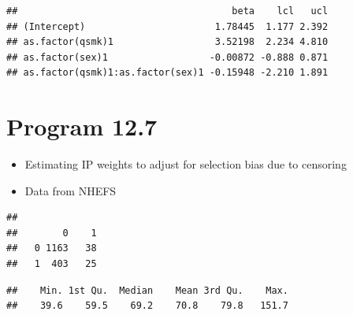 \documentclass[
  10pt,
]{book}
\newenvironment{Shaded}{\begin{snugshade}}{\end{snugshade}}
\newcommand{\DecValTok}[1]{\textcolor[rgb]{0.00,0.00,0.81}{#1}}
\newcommand{\FunctionTok}[1]{\textcolor[rgb]{0.00,0.00,0.00}{#1}}
\newcommand{\NormalTok}[1]{#1}
\newcommand{\SpecialCharTok}[1]{\textcolor[rgb]{0.00,0.00,0.00}{#1}}
\providecommand{\tightlist}{%
  \setlength{\itemsep}{0pt}\setlength{\parskip}{0pt}}
\begin{document}
\begin{verbatim}
##                                      beta    lcl   ucl
## (Intercept)                       1.78445  1.177 2.392
## as.factor(qsmk)1                  3.52198  2.234 4.810
## as.factor(sex)1                  -0.00872 -0.888 0.871
## as.factor(qsmk)1:as.factor(sex)1 -0.15948 -2.210 1.891
\end{verbatim}

\hypertarget{program-12.7}{%
\section{Program 12.7}\label{program-12.7}}

\begin{itemize}
\tightlist
\item
  Estimating IP weights to adjust for selection bias due to censoring
\item
  Data from NHEFS
\end{itemize}

\begin{Shaded}
\end{Shaded}

\begin{verbatim}
##    
##        0    1
##   0 1163   38
##   1  403   25
\end{verbatim}

\begin{Shaded}
\end{Shaded}

\begin{verbatim}
##    Min. 1st Qu.  Median    Mean 3rd Qu.    Max. 
##    39.6    59.5    69.2    70.8    79.8   151.7
\end{verbatim}

\begin{Shaded}
\end{Shaded}
\end{document}
